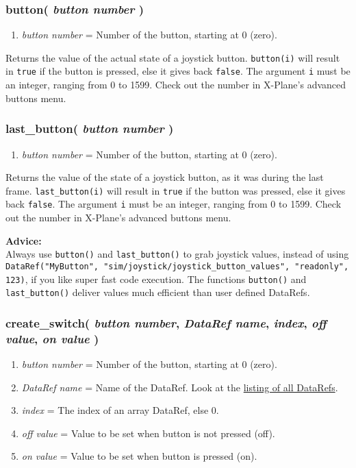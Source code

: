 \documentclass[11pt,parskip=half,a4paper]{scrartcl}
\begin{document}
\subsubsection{button( \emph{button number} )}

\begin{enumerate}
	\item \emph{button number} = Number of the button, starting at 0 (zero).
\end{enumerate}

Returns the value of the actual state of a joystick button. \verb|button(i)| will result in \verb|true| if the button is pressed, else it gives back \verb|false|. The argument \verb|i| must be an integer, ranging from 0 to 1599. Check out the number in X-Plane's advanced buttons menu.

\subsubsection{last\_button( \emph{button number} )}

\begin{enumerate}
	\item \emph{button number} = Number of the button, starting at 0 (zero).
\end{enumerate}

Returns the value of the state of a joystick button, as it was during the last frame. \verb|last_button(i)| will result in \verb|true| if the button was pressed, else it gives back \verb|false|. The argument \verb|i| must be an integer, ranging from 0 to 1599. Check out the number in X-Plane's advanced buttons menu.

\textbf{Advice:}\\
Always use \verb|button()| and \verb|last_button()| to grab joystick values, instead of using\\ \verb|DataRef("MyButton", "sim/joystick/joystick_button_values", "readonly", 123)|, if you like super fast code execution. The functions \verb|button()| and \verb|last_button()| deliver values much efficient than user defined DataRefs.

\subsubsection{create\_switch( \emph{button number}, \emph{DataRef name}, \emph{index}, \emph{off value}, \emph{on value} )}

\begin{enumerate}
	\item \emph{button number} = Number of the button, starting at 0 (zero).
	\item \emph{DataRef name} = Name of the DataRef. Look at the \href{http://www.xsquawkbox.net/xpsdk/docs/DataRefs.html}{listing of all DataRefs}.
	\item \emph{index} = The index of an array DataRef, else 0.
	\item \emph{off value} = Value to be set when button is not pressed (off).
	\item \emph{on value} = Value to be set when button is pressed (on).
\end{enumerate}
\end{document}
